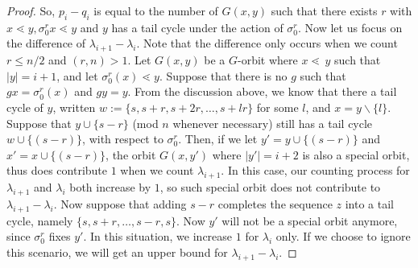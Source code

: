 \documentclass[10 pt]{amsart}
\theoremstyle{plain}
\theoremstyle{definition}
\theoremstyle{remark}
\numberwithin{equation}{section}
\newcommand{\minus}{\backslash}
\begin{document}
\begin{proof}
So, $p_i - q_i$ is equal to the number of $G(x, y)$ such that there exists $r$ with $x\lessdot y,\sigma_0^r x \lessdot y$ and $y$ has a tail cycle under the action of $\sigma_0^r$. Now let us focus on the difference of $\lambda_{i+1} - \lambda_{i}$.  Note that the difference only occurs  when we count $r \le n/2$ and $(r, n) > 1$. Let $G{(x , y)}$ be a $G$-orbit where $x \lessdot \, y$ such that $|y| = i+1$, and let $\sigma_0^{r} (x) \lessdot  y.$ Suppose that there is no $g$ such that $g x = \sigma_0 ^r (x)$ and $gy = y$. From the discussion above, we know that there a tail cycle of $y$, written $w := \{s,s+r,s+2r,\ldots,s+lr\}$  for some $l $, and $x = y \minus \{l\} $. Suppose that $y \cup \{s-r\}$ (mod $n$ whenever necessary) still has a tail cycle $w \cup \{(s - r)\}$, with respect to $\sigma_0^r.$ Then, if we let  $y' = y \cup \{(s - r) \} $ and $x' = x \cup \{(s -r)\}$, the orbit $G{(x, y')}$ where $|y'| = i+2$ is also a special orbit, thus does contribute $1$ when we count $\lambda_{i+1}$.  In this case, our counting process for $\lambda_{i+1}$ and $\lambda_{i}$ both increase by $1$, so such special orbit does not contribute to $\lambda_{i+1} - \lambda_{i}$.  Now suppose that adding $s -r$ completes the sequence $z$ into a tail cycle, namely $\{s,s+r,\ldots,s-r, s\}$. Now $y'$ will not be a special orbit anymore, since $\sigma_0^r $ fixes $y'$. In this situation,  we increase  $1$ for $\lambda_i$ only.  If we choose to ignore this scenario, we will get an upper bound for $\lambda_{i+1} - \lambda_i$. 


\end{proof}
\end{document}
